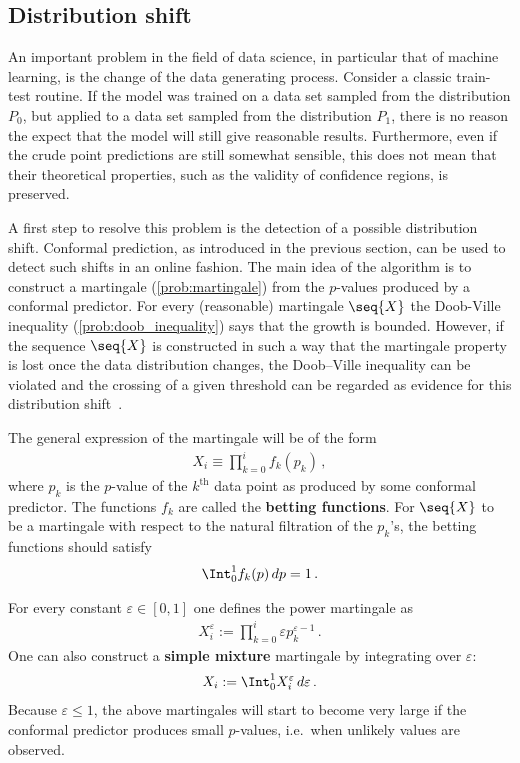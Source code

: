 
\subsection{Distribution shift}

    An important problem in the field of data science, in particular that of machine learning, is the change of the data generating process. Consider a classic train-test routine. If the model was trained on a data set sampled from the distribution $P_0$, but applied to a data set sampled from the distribution $P_1$, there is no reason the expect that the model will still give reasonable results. Furthermore, even if the crude point predictions are still somewhat sensible, this does not mean that their theoretical properties, such as the validity of confidence regions, is preserved.

    A first step to resolve this problem is the detection of a possible distribution shift. Conformal prediction, as introduced in the previous section, can be used to detect such shifts in an online fashion. The main idea of the algorithm is to construct a martingale (\cref{prob:martingale}) from the $p$-values produced by a conformal predictor. For every (reasonable) martingale $\seq{X}$ the Doob-Ville inequality (\cref{prob:doob_inequality}) says that the growth is bounded. However, if the sequence $\seq{X}$ is constructed in such a way that the martingale property is lost once the data distribution changes, the Doob--Ville inequality can be violated and the crossing of a given threshold can be regarded as evidence for this distribution shift~\citep{vovk_algorithmic_2005}.

    The general expression of the martingale will be of the form
    \begin{gather}
        X_i\equiv\prod_{k=0}^if_k(p_k)\,,
    \end{gather}
    where $p_k$ is the $p$-value of the $k^{\text{th}}$ data point as produced by some conformal predictor. The functions $f_k$ are called the \textbf{betting functions}. For $\seq{X}$ to be a martingale with respect to the natural filtration of the $p_k$'s, the betting functions should satisfy
    \begin{gather}
        \Int_0^1f_k(p)\,dp = 1\,.
    \end{gather}

    \begin{method}
        For every constant $\varepsilon\in[0,1]$ one defines the power martingale as
        \begin{gather}
            X^\varepsilon_i := \prod_{k=0}^i\varepsilon p^{\varepsilon-1}_k\,.
        \end{gather}
        One can also construct a \textbf{simple mixture} martingale by integrating over $\varepsilon$:
        \begin{gather}
            X_i := \Int_0^1X^\varepsilon_i\,d\varepsilon\,.
        \end{gather}
        Because $\varepsilon\leq1$, the above martingales will start to become very large if the conformal predictor produces small $p$-values, i.e.~when unlikely values are observed.
    \end{method}

